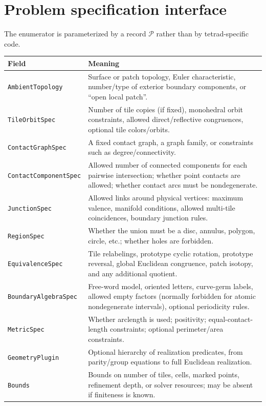 \documentclass[11pt]{article}
\begin{document}
\section{Problem specification interface}
\label{sec:spec}

The enumerator is parameterized by a record $\mathcal P$ rather than by tetrad-specific code.

\begin{longtable}{p{}p{}}
\toprule
Field & Meaning \\
\midrule
\endhead
\texttt{AmbientTopology} & Surface or patch topology, Euler characteristic, number/type of exterior boundary components, or ``open local patch''. \\
\texttt{TileOrbitSpec} & Number of tile copies (if fixed), monohedral orbit constraints, allowed direct/reflective congruences, optional tile colors/orbits. \\
\texttt{ContactGraphSpec} & A fixed contact graph, a graph family, or constraints such as degree/connectivity. \\
\texttt{ContactComponentSpec} & Allowed number of connected components for each pairwise intersection; whether point contacts are allowed; whether contact arcs must be nondegenerate. \\
\texttt{JunctionSpec} & Allowed links around physical vertices: maximum valence, manifold conditions, allowed multi-tile coincidences, boundary junction rules. \\
\texttt{RegionSpec} & Whether the union must be a disc, annulus, polygon, circle, etc.; whether holes are forbidden. \\
\texttt{EquivalenceSpec} & Tile relabelings, prototype cyclic rotation, prototype reversal, global Euclidean congruence, patch isotopy, and any additional quotient. \\
\texttt{BoundaryAlgebraSpec} & Free-word model, oriented letters, curve-germ labels, allowed empty factors (normally forbidden for atomic nondegenerate intervals), optional periodicity rules. \\
\texttt{MetricSpec} & Whether arclength is used; positivity; equal-contact-length constraints; optional perimeter/area constraints. \\
\texttt{GeometryPlugin} & Optional hierarchy of realization predicates, from parity/group equations to full Euclidean realization. \\
\texttt{Bounds} & Bounds on number of tiles, cells, marked points, refinement depth, or solver resources; may be absent if finiteness is known. \\
\bottomrule
\end{longtable}
\end{document}
